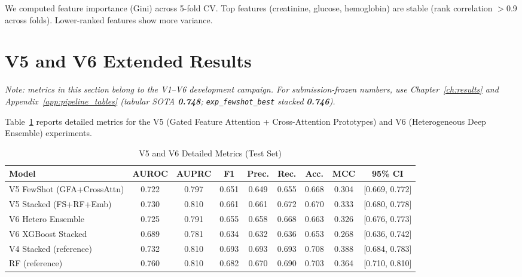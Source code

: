 We computed feature importance (Gini) across 5-fold CV. Top features (creatinine, glucose, hemoglobin) are stable (rank correlation $>$0.9 across folds). Lower-ranked features show more variance.

\section{V5 and V6 Extended Results}
\label{sec:v5v6_extended}

\noindent\textit{Note: metrics in this section belong to the V1--V6 development campaign. For submission-frozen numbers, use Chapter~\ref{ch:results} and Appendix~\ref{app:pipeline_tables} (tabular SOTA \textbf{0.748}; \texttt{exp\_fewshot\_best} stacked \textbf{0.746}).}

Table~\ref{tab:v5v6_detailed} reports detailed metrics for the V5 (Gated Feature Attention + Cross-Attention Prototypes) and V6 (Heterogeneous Deep Ensemble) experiments.

\begin{table}[htbp]
\centering
\caption{V5 and V6 Detailed Metrics (Test Set)}
\small
\begin{tabular}{lcccccccc}
\toprule
Model & AUROC & AUPRC & F1 & Prec. & Rec. & Acc. & MCC & 95\% CI \\
\midrule
V5 FewShot (GFA+CrossAttn) & 0.722 & 0.797 & 0.651 & 0.649 & 0.655 & 0.668 & 0.304 & [0.669, 0.772] \\
V5 Stacked (FS+RF+Emb) & 0.730 & 0.810 & 0.661 & 0.661 & 0.672 & 0.670 & 0.333 & [0.680, 0.778] \\
V6 Hetero Ensemble & 0.725 & 0.791 & 0.655 & 0.658 & 0.668 & 0.663 & 0.326 & [0.676, 0.773] \\
V6 XGBoost Stacked & 0.689 & 0.781 & 0.634 & 0.632 & 0.636 & 0.653 & 0.268 & [0.636, 0.742] \\
\midrule
V4 Stacked (reference) & 0.732 & 0.810 & 0.693 & 0.693 & 0.693 & 0.708 & 0.388 & [0.684, 0.783] \\
RF (reference) & 0.760 & 0.810 & 0.682 & 0.670 & 0.690 & 0.703 & 0.364 & [0.710, 0.810] \\
\bottomrule
\end{tabular}
\label{tab:v5v6_detailed}
\end{table}

